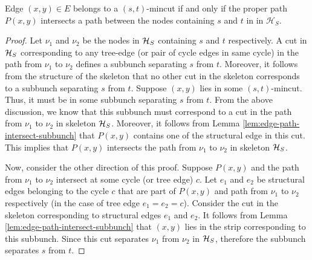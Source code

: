 \begin{lemma} \label{lem:path-intersects-tree}
 Edge $(x,y)\in E$ belongs to a $(s,t)$-mincut if and only if the proper path $P(x,y)$ intersects a path between the nodes containing $s$ and $t$ in in $\mathcal H_{S}$.
\end{lemma}
\begin{proof}




Let $\nu_1$ and $\nu_2$ be the nodes in ${\cal H}_S$ containing $s$ and $t$ respectively. A cut in ${\cal H}_S$ corresponding to any tree-edge (or pair of cycle edges in same cycle) in the path from $\nu_1$ to $\nu_2$ defines a subbunch separating $s$ from $t$. Moreover, it follows from the structure of the skeleton that no other cut in the skeleton corresponds to a subbunch separating $s$ from $t$. Suppose $(x,y)$ lies in some $(s,t)$-mincut. Thus, it must be in some subbunch separating $s$ from $t$. From the above discussion, we know that this subbunch must correspond to a cut in the path from $\nu_1$ to $\nu_2$ in skeleton ${\cal H}_S$. Moreover, it follows from Lemma \ref{lem:edge-path-intersect-subbunch} that $P(x,y)$ contains one of the structural edge in this cut. This implies that $P(x,y)$ intersects the path from $\nu_1$ to $\nu_2$ in skeleton ${\cal H}_S$.

Now, consider the other direction of this proof. Suppose $P(x,y)$ and the path from $\nu_1$ to $\nu_2$ intersect at some cycle (or tree edge) $c$. Let $e_1$ and $e_2$ be structural edges belonging to the cycle $c$ that are part of $P(x,y)$ and path from $\nu_1$ to $\nu_2$ respectively (in the case of tree edge $e_1=e_2=c$). Consider the cut in the skeleton corresponding to structural edges $e_1$ and $e_2$. It follows from Lemma \ref{lem:edge-path-intersect-subbunch} that $(x,y)$ lies in the strip corresponding to this subbunch. Since this cut separates $\nu_1$ from $\nu_2$ in ${\cal H}_S$, therefore the subbunch separates $s$ from $t$.
\end{proof}

